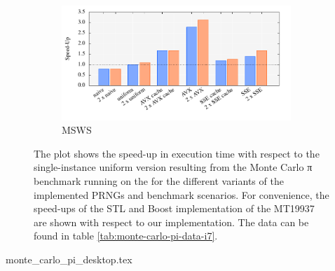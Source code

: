 \documentclass{stdlocal}
\begin{document}
\begin{figure}
      \begin{subfigure}[b]{\textwidth}
        \center
        \includegraphics[width=0.95\textwidth]{plots/monte_carlo_pi_desktop_msws.pdf}
        \caption{MSWS}
      \end{subfigure}
      \caption[Monte Carlo π Benchmark Speed-Up for ]{%
        The plot shows the speed-up in execution time with respect to the single-instance uniform version resulting from the Monte Carlo π benchmark running on the  for the different variants of the implemented PRNGs and benchmark scenarios.
        For convenience, the speed-ups of the STL and Boost implementation of the MT19937 are shown with respect to our implementation.
        The data can be found in table \ref{tab:monte-carlo-pi-data-i7}.
      }
    \end{figure}

    \begin{table}
      \center
      \caption[Monte Carlo π Benchmark Data for ]{%
        The table shows the results achieved by running the Monte Carlo π Benchmark on the  with all implemented variants of given PRNGs and benchmark scenarios.
        While running the benchmark, $10^{8}$ samples in the unit square were used to estimate the value of π.
        It was ensured that the estimation error was small enough according to the calculation at the end of section \ref{sub:monte_carlo_integration}.
        During the execution, there were no cache or branch misses.
        The values for cycles, instructions, and IPCs were averaged over the number of samples in the unit square.
      }
      \label{tab:monte-carlo-pi-data-i7}
      \footnotesize
      \renewcommand{\arraystretch}{1.2}
      {monte_carlo_pi_desktop.tex}
    \end{table}

\end{document}

